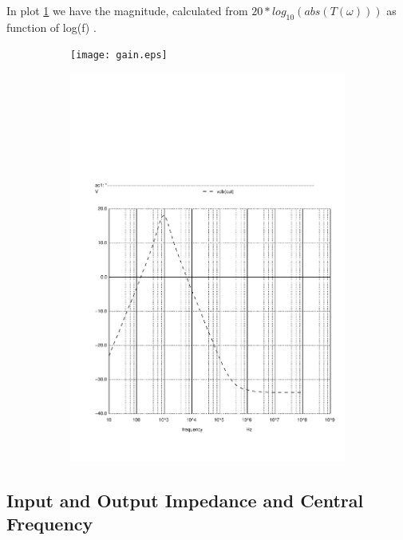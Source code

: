 In plot \ref{fig:argTOct} we have the magnitude, calculated from $20*log_{10}(abs(T(\omega)))$ as function of log(f) .

\begin{figure}[h]
  \centering
  \begin{subfigure}{0.5\textwidth}
    \texttt{[image: gain.eps]}
    \label{fig:argTOct}
  \end{subfigure}
  \begin{subfigure}{0.4\textwidth}
    \includegraphics[width=\linewidth, clip]{gain.pdf}
    \label{fig:argTSpi}
  \end{subfigure}
  \caption{\small }
  \label{}
\end{figure}

\subsection{Input and Output Impedance and Central Frequency}

